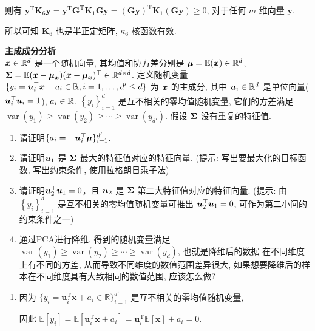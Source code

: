 \documentclass[answers]{exam}  %
\begin{document}
\begin{questions}
\begin{solution}
\begin{enumerate}
            则有 $\bm{y}^{\mathrm{T}}\bm{K}_6\bm{y} = \bm{y}^{\mathrm{T}}\bm{G}^{\mathrm{T}}\bm{K}_1\bm{G}\bm{y} = (\bm{G}\bm{y})^{\mathrm{T}}\bm{K}_1(\bm{G}\bm{y}) \ge 0$, 对于任何 $m$ 维向量 $\bm{y}$.

            所以可知 $\bm{K}_6$ 也是半正定矩阵, $\kappa_6$ 核函数有效.
    \end{enumerate}
  \end{solution}

  \question [20] \textbf{主成成分分析} \\
  ${\boldsymbol{x}} \in \mathbb{R}^{d}$ 是一个随机向量, 其均值和协方差分别是 $\boldsymbol{\mu}=\mathbb{E}({\boldsymbol{x}}) \in \mathbb{R}^{d}$, $\boldsymbol{\Sigma}=\mathbb{E}({\boldsymbol{x}}-\boldsymbol{\mu}_{\boldsymbol{x}})({\boldsymbol{x}}-\boldsymbol{\mu}_{\boldsymbol{x}})^{\top} \in \mathbb{R}^{d \times  d}$. 定义随机变量 $\{y_{i}=\boldsymbol{u}_{i}^{\top} {\boldsymbol{x}}+a_{i} \in \mathbb{R}, i=1, \ldots, {d'} \leq d\}$ 为 ${\boldsymbol{x}}$ 的主成分, 其中 $\boldsymbol{u}_{i} \in \mathbb{R}^{d}$ 是单位向量($\boldsymbol{u}_i^\top \boldsymbol{u}_i = 1$), $a_{i} \in \mathbb{R}$, $\left\{y_{i}\right\}_{i=1}^{{d'}}$ 是互不相关的零均值随机变量, 它们的方差满足 $\operatorname{var}\left(y_{1}\right) \geq \operatorname{var}\left(y_{2}\right) \geq \cdots \geq \operatorname{var}\left(y_{{d'}}\right)$. 假设 $\boldsymbol{\Sigma}$ 没有重复的特征值.
  \begin{enumerate}
    \item  请证明$\{a_{i}=-\boldsymbol{u}_{i}^{\top} \boldsymbol{\mu}\}_{i=1}^{d'}$.
    \item 请证明$\boldsymbol{u}_{1}$ 是 $\boldsymbol{\Sigma}$ 最大的特征值对应的特征向量. (提示: 写出要最大化的目标函数, 写出约束条件, 使用拉格朗日乘子法)
    \item 请证明$\boldsymbol{u}_{2}^{\top} \boldsymbol{u}_{1}=0$，且 $\boldsymbol{u}_{2}$ 是 $\boldsymbol{\Sigma}$ 第二大特征值对应的特征向量. (提示: 由 $\left\{y_{i}\right\}_{i=1}^{d}$ 是互不相关的零均值随机变量可推出 $\boldsymbol{u}_{2}^{\top} \boldsymbol{u}_{1}=0$, 可作为第二小问的约束条件之一)
    \item 通过PCA进行降维, 得到的随机变量满足$\operatorname{var}\left(y_{1}\right) \geq \operatorname{var}\left(y_{2}\right) \geq \cdots \geq \operatorname{var}\left(y_{d}\right)$, 也就是降维后的数据 在不同维度上有不同的方差, 从而导致不同维度的数值范围差异很大, 如果想要降维后的样本在不同维度具有大致相同的数值范围, 应该怎么做?
  \end{enumerate}
  \begin{solution}
    \begin{enumerate}
      \item

            因为 $\{ y_i = \bm{u}_i^{\mathrm{T}}\bm{x} + a_i \in \mathbb{R} \}_{i=1}^{d'}$ 是互不相关的零均值随机变量,

            因此 $\mathbb{E}[y_i] = \mathbb{E}[\bm{u}_i^{\mathrm{T}}\bm{x} + a_i] = \bm{u}_i^{\mathrm{T}}\mathbb{E}[\bm{x}] + a_i = 0$.


\end{enumerate}
\end{solution}
\end{questions}
\end{document}
